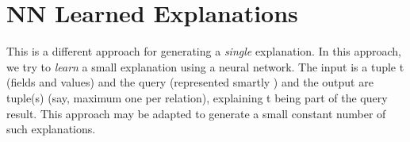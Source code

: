 \section{NN Learned Explanations} 
This is a different approach for generating a \textit{single} explanation. In this approach, we try to \textit{learn} a small explanation using a neural network. The input is a tuple t (fields and values) and the query (represented smartly \cite {DBLP:conf/cidr/KipfKRLBK19,DBLP:journals/corr/abs-2004-07009}) and the output are tuple(s) (say, maximum one per relation), explaining t being part of the query result. This approach may be adapted to generate a small constant number of such explanations.


